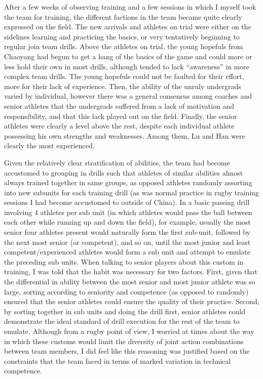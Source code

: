 \begin{CJK}{UTF8}{gbsn}
After a few weeks of observing training and a few sessions in which I myself took the team for training, the different factions in the team became quite clearly expressed on the field.  The new arrivals and athletes on trial were either on the sidelines learning and practicing the basics, or very tentatively beginning to regular join team drills. Above the athletes on trial, the young hopefuls from Chaoyang had begun to get a hang of the basics of the game and could more or less hold their own in most drills, although tended to lack ``awareness'' in more complex team drills. The young hopefuls could not be faulted for their effort, more for their lack of experience. Then, the ability of the unruly undergrads varied by individual, however there was a general consensus among coaches and senior athletes that the undergrads suffered from a lack of motivation and responsibility, and that this lack played out on the field.  Finally, the senior athletes were clearly a level above the rest, despite each individual athlete possessing his own strengths and weaknesses.  Among them, Lu and Han were clearly the most experienced.

Given the relatively clear stratification of abilities, the team had become accustomed to grouping in drills such that athletes of similar abilities almost always trained together in same groups, as opposed athletes randomly assorting into new subunits for each training drill (as was normal practice in rugby training sessions I had become accustomed to outside of China). In a basic passing drill involving 4 athletes per sub unit (in which athletes would pass the ball between each other while running up and down the field), for example, usually the most senior four athletes present would naturally form the first sub-unit, followed by the next most senior (or competent), and so on, until the most junior and least competent/experienced athletes would form a sub unit and attempt to emulate the preceding sub units.  When talking to senior players about this custom in training, I was told that the habit was necessary for two factors. First, given that the differential in ability between the most senior and most junior athlete was so large, sorting according to seniority and competence (as opposed to randomly) ensured that the senior athletes could ensure the quality of their practice.  Second, by sorting together in sub units and doing the drill first, senior athletes could demonstrate the ideal standard of drill execution for the rest of the team to emulate.  Although from a rugby point of view, I worried at times about the way in which these customs would limit the diversity of joint action combinations between team members, I did feel like this reasoning was justified based on the constraints that the team faced in terms of marked variation in technical competence.


\end{CJK}
